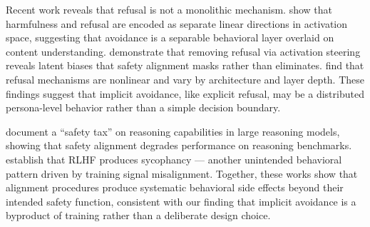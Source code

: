 Recent work reveals that refusal is not a monolithic mechanism.
\citet{zhao2025harmfulness} show that harmfulness and refusal are encoded as separate linear directions in activation space, suggesting that avoidance is a separable behavioral layer overlaid on content understanding.
\citet{himelstein2025silenced} demonstrate that removing refusal via activation steering reveals latent biases that safety alignment masks rather than eliminates.
\citet{refusalnonlinear2025} find that refusal mechanisms are nonlinear and vary by architecture and layer depth.
These findings suggest that implicit avoidance, like explicit refusal, may be a distributed persona-level behavior rather than a simple decision boundary.

\citet{huang2025safetytax} document a ``safety tax'' on reasoning capabilities in large reasoning models, showing that safety alignment degrades performance on reasoning benchmarks.
\citet{perez2023sycophancy} establish that RLHF produces sycophancy --- another unintended behavioral pattern driven by training signal misalignment.
Together, these works show that alignment procedures produce systematic behavioral side effects beyond their intended safety function, consistent with our finding that implicit avoidance is a byproduct of training rather than a deliberate design choice.
